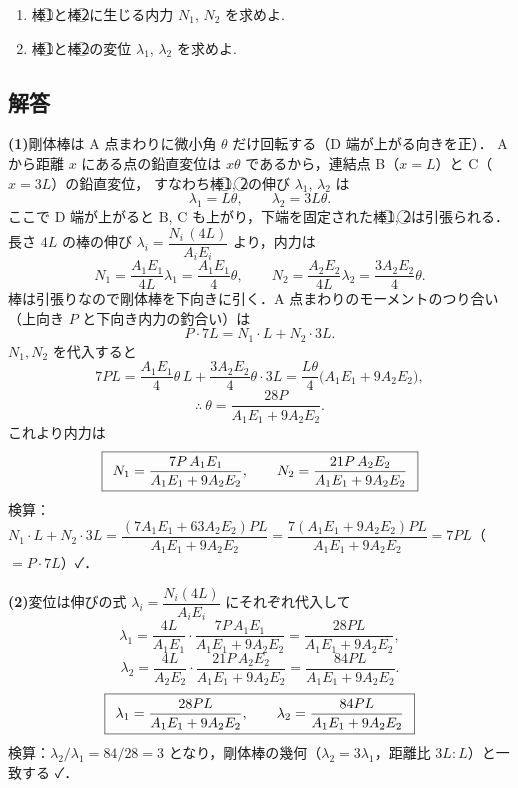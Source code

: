 \documentclass[11pt,a4paper]{article}
\begin{document}
\begin{enumerate}[label=(\arabic*)]
  \item 棒\textcircled{1}と棒\textcircled{2}に生じる内力 $N_1$, $N_2$ を求めよ.
  \item 棒\textcircled{1}と棒\textcircled{2}の変位 $\lambda_1$, $\lambda_2$ を求めよ.
\end{enumerate}

\subsection*{解答}

\noindent\textbf{(1)}\quad 剛体棒は A 点まわりに微小角 $\theta$ だけ回転する（D 端が上がる向きを正）．
A から距離 $x$ にある点の鉛直変位は $x\theta$ であるから，連結点 B（$x=L$）と C（$x=3L$）の鉛直変位，
すなわち棒\textcircled{1}, \textcircled{2}の伸び $\lambda_1$, $\lambda_2$ は
\[
  \lambda_1 = L\theta, \qquad \lambda_2 = 3L\theta. \tag{適合条件}
\]
ここで D 端が上がると B, C も上がり，下端を固定された棒\textcircled{1}, \textcircled{2}は引張られる．
長さ $4L$ の棒の伸び $\lambda_i = \dfrac{N_i\,(4L)}{A_iE_i}$ より，内力は
\[
  N_1 = \frac{A_1E_1}{4L}\lambda_1 = \frac{A_1E_1}{4}\theta, \qquad
  N_2 = \frac{A_2E_2}{4L}\lambda_2 = \frac{3A_2E_2}{4}\theta.
\]
棒は引張りなので剛体棒を下向きに引く．A 点まわりのモーメントのつり合い（上向き $P$ と下向き内力の釣合い）は
\[
  P\cdot 7L = N_1\cdot L + N_2\cdot 3L.
\]
$N_1, N_2$ を代入すると
\[
  7PL = \frac{A_1E_1}{4}\theta\,L + \frac{3A_2E_2}{4}\theta\cdot 3L
      = \frac{L\theta}{4}\bigl(A_1E_1 + 9A_2E_2\bigr),
\]
\[
  \therefore\ \theta = \frac{28P}{A_1E_1 + 9A_2E_2}.
\]
これより内力は
\[
  \boxed{\,\;N_1 = \frac{7P\,A_1E_1}{A_1E_1 + 9A_2E_2}, \qquad
        N_2 = \frac{21P\,A_2E_2}{A_1E_1 + 9A_2E_2}\;\,}
\]
検算：$N_1\cdot L + N_2\cdot 3L
= \dfrac{(7A_1E_1 + 63A_2E_2)PL}{A_1E_1+9A_2E_2}
= \dfrac{7(A_1E_1+9A_2E_2)PL}{A_1E_1+9A_2E_2} = 7PL$（$=P\cdot 7L$）✓．

\medskip
\noindent\textbf{(2)}\quad 変位は伸びの式 $\lambda_i = \dfrac{N_i(4L)}{A_iE_i}$ にそれぞれ代入して
\[
  \lambda_1 = \frac{4L}{A_1E_1}\cdot\frac{7P\,A_1E_1}{A_1E_1+9A_2E_2}
            = \frac{28PL}{A_1E_1+9A_2E_2},
\]
\[
  \lambda_2 = \frac{4L}{A_2E_2}\cdot\frac{21P\,A_2E_2}{A_1E_1+9A_2E_2}
            = \frac{84PL}{A_1E_1+9A_2E_2}.
\]
\[
  \boxed{\,\;\lambda_1 = \frac{28PL}{A_1E_1 + 9A_2E_2}, \qquad
        \lambda_2 = \frac{84PL}{A_1E_1 + 9A_2E_2}\;\,}
\]
検算：$\lambda_2/\lambda_1 = 84/28 = 3$ となり，剛体棒の幾何（$\lambda_2=3\lambda_1$，距離比 $3L:L$）と一致する ✓．
\end{document}
